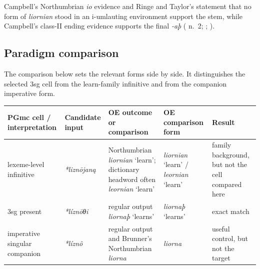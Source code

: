 \documentclass[
  british,
  a4paper,
  openany]{book}
\newcounter{none} %
\begin{document}
Campbell's Northumbrian \emph{io} evidence and Ringe and Taylor's
statement that no form of \emph{liornian} stood in an i-umlauting
environment support the stem, while Campbell's class-II ending evidence
supports the final \emph{-aþ} ( n.~2; ; ).

\subsection{Paradigm comparison}\label{paradigm-comparison-23}

The comparison below sets the relevant forms side by side. It
distinguishes the selected 3sg cell from the learn-family infinitive and
from the companion imperative form.

{\def\LTcaptype{none} %
\begin{longtable}[]{@{}
  >{\raggedright\arraybackslash}p{}
  >{\raggedright\arraybackslash}p{}
  >{\raggedright\arraybackslash}p{}
  >{\raggedright\arraybackslash}p{}
  >{\raggedright\arraybackslash}p{}@{}}
\toprule\noalign{}
\begin{minipage}[b]{\linewidth}\raggedright
PGmc cell / interpretation
\end{minipage} & \begin{minipage}[b]{\linewidth}\raggedright
Candidate input
\end{minipage} & \begin{minipage}[b]{\linewidth}\raggedright
OE outcome or comparison
\end{minipage} & \begin{minipage}[b]{\linewidth}\raggedright
OE comparison form
\end{minipage} & \begin{minipage}[b]{\linewidth}\raggedright
Result
\end{minipage} \\
\midrule\noalign{}
\endhead
\bottomrule\noalign{}
\endlastfoot
lexeme-level infinitive & {\emph{*liznōjaną}} & Northumbrian
{\emph{liornian}} `learn'; dictionary headword often {\emph{leornian}}
`learn' & {\emph{liornian}} `learn' / {\emph{leornian}} `learn' & family
background, but not the cell compared here \\
3sg present & {\emph{*líznōθi}} & regular output {\emph{liornaþ}}
`learns' & {\emph{liornaþ}} `learns' & exact match \\
imperative singular companion & {\emph{*líznô}} & regular output and
Brunner's Northumbrian {\emph{liorna}} & {\emph{liorna}} & useful
control, but not the target \\
\end{longtable}
}
\end{document}
